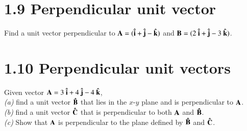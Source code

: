 \documentclass{article}
\newcommand{\vi}{\vb{\hat i}}
\newcommand{\vj}{\vb{\hat j}}
\newcommand{\vk}{\vb{\hat k}}
\begin{document}
\section*{1.9 Perpendicular unit vector}
Find a unit vector perpendicular to $\vb A = (\vi + \vj - \vk)$ and $\vb B = (2\ \vi + \vj - 3\ \vk)$.

\section*{1.10 Perpendicular unit vectors}
Given vector $\vb A = 3\ \vi + 4\ \vj - 4\ \vk$, \\
\textit{(a)} find a unit vector $\vb{\hat B}$ that lies in the $x$-$y$ plane and is perpendicular to $\vb A$.\\
\textit{(b)} find a unit vector $\vb{\hat C}$ that is perpendicular to both $\vb A$ and $\vb{\hat B}$. \\
\textit{(c)} Show that $\vb A$ is perpendicular to the plane defined by $\vb{\hat B}$ and $\vb{\hat C}$.
\end{document}

